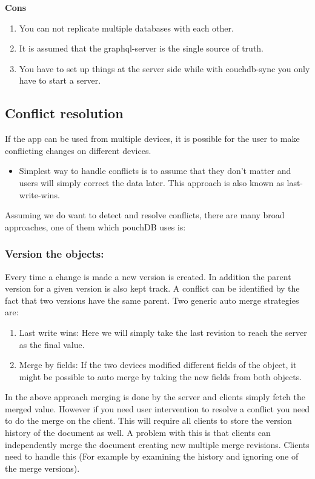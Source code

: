 \textbf{Cons}
\begin{enumerate}
    \item You can not replicate multiple databases with each other.
    \item It is assumed that the graphql-server is the single source of truth.
    \item You have to set up things at the server side while with couchdb-sync 
    you only have to start a server.
\end{enumerate}


\subsection{Conflict resolution}
If the app can be used from multiple devices, it is possible for the user to make 
conflicting changes on different devices.

\begin{itemize}
    \item Simplest way to handle conflicts is to assume that they don’t matter and 
    users will simply correct the data later. This approach is also known as last-write-wins.
\end{itemize}

Assuming we do want to detect and resolve conflicts, there are many broad approaches, 
one of them which pouchDB uses is:

\subsubsection{Version the objects:}

Every time a change is made a new version is created. In addition the parent version for a given 
version is also kept track. A conflict can be identified by the fact that two versions have the 
same parent. Two generic auto merge strategies are:

\begin{enumerate}
    \item Last write wins: Here we will simply take the last revision to 
    reach the server as the final value.
    \item Merge by fields: If the two devices modified different fields 
    of the object, it might be possible to auto merge by taking the new fields from both objects.
\end{enumerate}

In the above approach merging is done by the server and clients simply fetch the merged value. 
However if you need user intervention to resolve a conflict you need to do the merge on the client.
This will require all clients to store the version history of the document as well. A problem with this 
is that clients can independently merge the document creating new multiple merge revisions.
Clients need to handle this (For example by examining the history and ignoring one of the merge versions).

